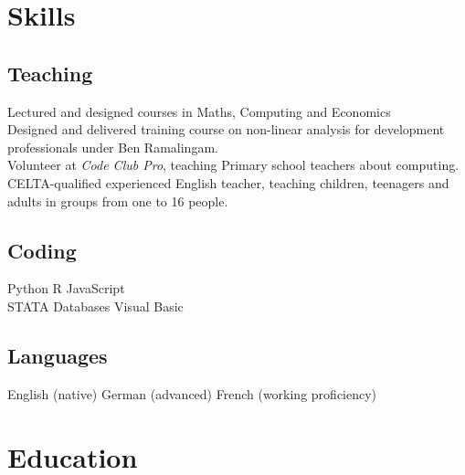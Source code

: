 \documentclass[a4paper]{deedy-resume} %
\begin{document}
\begin{minipage}[t]{0.3\textwidth} %


    \section{Skills}

    \subsection{Teaching}
    \textbullet{} Lectured and designed courses in Maths, Computing and Economics \\
    \textbullet{} Designed and delivered training course on non-linear analysis for development professionals under Ben Ramalingam.\\
    \textbullet{} Volunteer at \textit{Code Club Pro}, teaching Primary school teachers about computing.\\
    \textbullet{} CELTA-qualified experienced English teacher, teaching children, teenagers and adults in groups from one to 16 people. \\
    
    \subsection{Coding}

    Python \textbullet{} R \textbullet{} JavaScript \\
    STATA \textbullet{} Databases \textbullet{} Visual Basic 

    \sectionspace %

    \subsection{Languages}
    English (native) \textbullet{} German (advanced) \textbullet{} French (working proficiency)


    \section{Education} 
    

\end{minipage}
\end{document}
